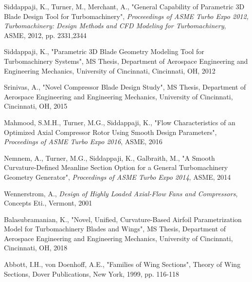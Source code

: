 \documentclass[8pt]{article}
\begin{document}
\begin{thebibliography}{1}
    
    Siddappaji, K., Turner, M., Merchant, A., "General Capability of Parametric 3D Blade Design Tool for Turbomachinery", 
    \textit{Proceeedings of ASME Turbo Expo 2012, Turbomachinery: Design Methods and CFD Modeling for Turbomachinery}, ASME,
    2012, pp. 2331,2344

    Siddappaji, K., "Parametric 3D Blade Geometry Modeling Tool for Turbomachinery Systems", MS Thesis,
    Department of Aerospace Engineering and Engineering Mechanics, University of Cincinnati, Cincinnati, OH, 2012

    Srinivas, A., "Novel Compressor Blade Design Study", MS Thesis, Department of Aerospace Engineering and Engineering 
    Mechanics, University of Cincinnati, Cincinnati, OH, 2015

    Mahmood, S.M.H., Turner, M.G., Siddappaji, K., "Flow Characteristics of an Optimized Axial Compressor Rotor Using Smooth
    Design Parameters", \textit{Proceedings of ASME Turbo Expo 2016}, ASME, 2016

    Nemnem, A., Turner, M.G., Siddappaji, K., Galbraith, M., 
    "A Smooth Curvature-Defined Meanline Section Option for a General Turbomachinery Geometry Generator", 
    \textit{Proceedings of ASME Turbo Expo 2014}, ASME, 2014

    Wennerstrom, A., \textit{Design of Highly Loaded Axial-Flow Fans and Compressors}, Concepts Eti., Vermont, 2001

    Balasubramanian, K., "Novel, Unified, Curvature-Based Airfoil Parametrization Model for Turbomachinery Blades and Wings",
    MS Thesis, Department of Aerospace Engineering and Engineering Mechanics, University of Cincinnati, Cincinnati, OH, 2018

    Abbott, I.H., von Doenhoff, A.E., "Families of Wing Sections", Theory of Wing Sections, Dover Publications, New York, 
    1999, pp. 116-118

\end{thebibliography}
\end{document}
